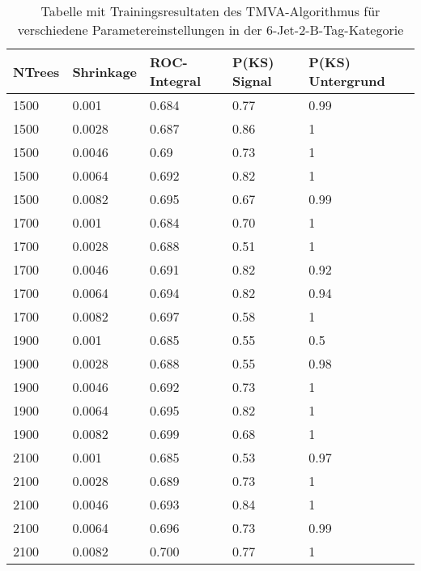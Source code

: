 \begin{table}[tbp]\parbox{12cm}{
\renewcommand\thetable{A.3}
  \caption[TMVA 6j2t Ergebnisse]{Tabelle mit Trainingsresultaten des TMVA-Algorithmus f\"ur verschiedene Parametereinstellungen in der 6-Jet-2-B-Tag-Kategorie}%
  }\label{tab:tmva_6j2t}
  \begin{center}
  \begin{tabular}{lllll}
  \hline
  NTrees & Shrinkage & ROC-Integral & P(KS) Signal & P(KS) Untergrund\\
  \hline
\num{1500} & \num{0.001}  & \num{0,684} & \num{0,77} & \num{0,99}\\
\num{1500} & \num{0.0028} & \num{0,687} & \num{0,86} & \num{1}\\
\num{1500} & \num{0.0046} & \num{0,69}  & \num{0,73} & \num{1}\\
\num{1500} & \num{0.0064} & \num{0,692} & \num{0,82} & \num{1}\\
\num{1500} & \num{0.0082} & \num{0,695} & \num{0,67} & \num{0,99}\\
\num{1700} & \num{0.001}  & \num{0,684} & \num{0,70} & \num{1}\\
\num{1700} & \num{0.0028} & \num{0,688} & \num{0,51} & \num{1}\\
\num{1700} & \num{0.0046} & \num{0,691} & \num{0,82} & \num{0,92}\\
\num{1700} & \num{0.0064} & \num{0,694} & \num{0,82} & \num{0,94}\\
\num{1700} & \num{0.0082} & \num{0,697} & \num{0,58} & \num{1}\\
\num{1900} & \num{0.001}  & \num{0,685} & \num{0,55} & \num{0,5}\\
\num{1900} & \num{0.0028} & \num{0,688} & \num{0,55} & \num{0,98}\\
\num{1900} & \num{0.0046} & \num{0,692} & \num{0,73} & \num{1}\\
\num{1900} & \num{0.0064} & \num{0,695} & \num{0,82} & \num{1}\\
\num{1900} & \num{0.0082} & \num{0,699} & \num{0,68} & \num{1}\\
\num{2100} & \num{0.001}  & \num{0,685} & \num{0,53} & \num{0,97}\\
\num{2100} & \num{0.0028} & \num{0,689} & \num{0,73} & \num{1}\\
\num{2100} & \num{0.0046} & \num{0,693} & \num{0,84} & \num{1}\\
\num{2100} & \num{0.0064} & \num{0,696} & \num{0,73} & \num{0,99}\\
\num{2100} & \num{0.0082} & \num{0,700} & \num{0,77} & \num{1}\\

\end{tabular}
\end{center}
\end{table}
